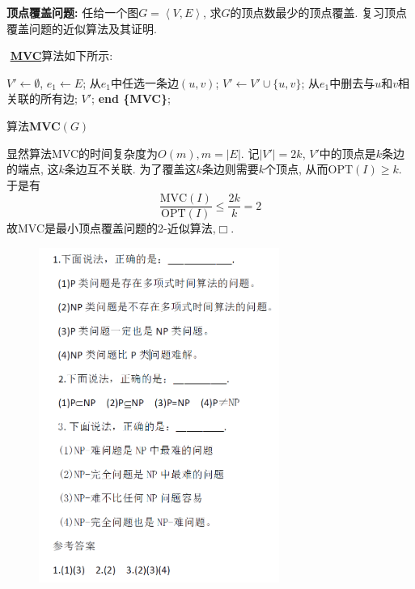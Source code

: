 \documentclass{article}
\begin{document}
\begin{homeworkProblem}
    \textbf{顶点覆盖问题:} 任给一个图$G=\left<V,E\right>$, 求$G$的顶点数最少的顶点覆盖. 复习顶点覆盖问题的近似算法及其证明.

    \solution \,\,\hyperlink{alg:MVC}{\textbf{MVC}}算法如下所示: 
    \begin{algorithm}[H]
		\begin{algorithmic}[1]
        \State $V'\gets \emptyset$, $e_1\gets E$;
            \State 从$e_1$中任选一条边$(u,v)$;
            \State $V'\gets V' \cup \{u,v\}$;
            \State 从$e_1$中删去与$u$和$v$相关联的所有边;
        \EndWhile
        \State \Return $V'$;
		\State \textbf{end \{MVC\}};
		\end{algorithmic}
		\caption{算法\textbf{MVC}$(G)$}
		\label{alg:MVC}
	\end{algorithm}
    显然算法MVC的时间复杂度为$O(m),m=|E|$. 记$\left|V'\right|=2k$, $V'$中的顶点是$k$条边的端点, 这$k$条边互不关联. 为了覆盖这$k$条边则需要$k$个顶点, 从而$\text{OPT}(I)\geq k$. 于是有$$\frac{\text{MVC}\left( I \right)}{\text{OPT}\left( I \right)}\le \frac{2k}{k}=2
    $$
    故MVC是最小顶点覆盖问题的2-近似算法,$\Box.$
\end{homeworkProblem}

\begin{homeworkProblem}
    \begin{figure}[H]
		\centering
		\includegraphics[width=0.7\textwidth]{images/title/补充练习.png}
	\end{figure}
\end{homeworkProblem}





\end{document}
